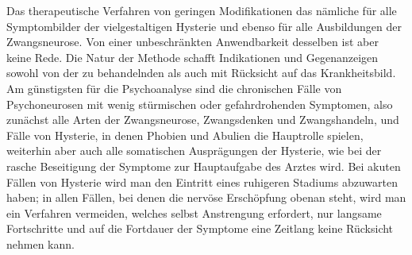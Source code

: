 \documentclass[twoside=true,titlepage=false,open=any, parskip=never, fontsize=10pt, headings=small, chapterprefix=false, appendixprefix=false]{scrbook}
\begin{document}
            
        \pstart
        Das therapeutische Verfahren  von geringen Modifikationen
                das nämliche für alle Symptombilder der vielgestaltigen
               Hysterie und ebenso für alle Ausbildungen
               der Zwangsneurose. Von einer
               unbeschränkten Anwendbarkeit desselben ist aber keine Rede. Die Natur der  Methode schafft Indikationen und Gegenanzeigen sowohl von  der zu behandelnden  als auch mit Rücksicht auf das Krankheitsbild. Am günstigsten für die
               Psychoanalyse sind die chronischen Fälle von Psychoneurosen mit wenig
               stürmischen oder gefahrdrohenden Symptomen, also zunächst alle Arten der
               Zwangsneurose, Zwangsdenken und Zwangshandeln, und Fälle von Hysterie, in
               denen Phobien und Abulien  die
               Hauptrolle spielen, weiterhin aber auch alle somatischen Ausprägungen der
               Hysterie, 
                wie bei der  rasche Beseitigung der Symptome zur Hauptaufgabe des Arztes wird. Bei
               akuten Fällen von Hysterie wird man den Eintritt eines ruhigeren Stadiums
               abzuwarten haben; in allen Fällen, bei denen die nervöse Erschöpfung obenan
               steht, wird man ein Verfahren vermeiden, welches selbst Anstrengung erfordert,
               nur langsame Fortschritte  und auf die Fortdauer der Symptome eine Zeitlang keine Rücksicht nehmen
               kann.
        \pend
    
\end{document}
